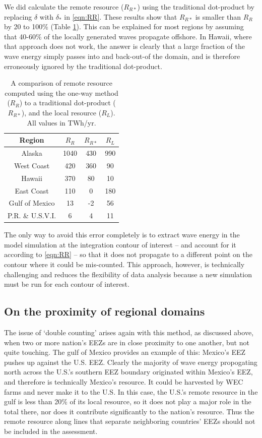 We did calculate the remote resource ($R_{R*}$) using the traditional dot-product by replacing $\delta$ with $\delta_*$ in \eqref{eqn:RR}. These results show that $R_{R*}$ is smaller than $R_R$ by 20 to 100\% (Table \ref{tab:RR*}). This can be explained for most regions by assuming that 40-60\% of the locally generated waves propagate offshore. In Hawaii, where that approach does not work, the answer is clearly that a large fraction of the wave energy simply passes into and back-out-of the domain, and is therefore erroneously ignored by the traditional dot-product.

\begin{table}[ht]
  \centering
  \begin{tabular}{cccc}
  \hline
  Region & $R_R$ & $R_{R*}$ & $R_{L}$ \\
  \hline
  Alaska & 1040 & 430 & 990 \\
  West Coast & 420 & 360 & 90 \\
  Hawaii & 370 & 80 & 10 \\
  East Coast & 110 & 0 & 180 \\
  Gulf of Mexico & 13 & -2 & 56 \\
  P.R. \& U.S.V.I. & 6 & 4 & 11 \\
  \hline
  \end{tabular}
  \label{tab:RR*}
  \caption{A comparison of remote resource computed using the one-way method ($R_R$) to a traditional dot-product ($R_{R*}$), and the local resource ($R_{L}$). All values in TWh/yr.}
\end{table}

The only way to avoid this error completely is to extract wave energy in the model simulation at the integration contour of interest -- and account for it according to \eqref{eqn:RR} -- so that it does not propagate to a different point on the contour where it could be mis-counted. This approach, however, is technically challenging and reduces the flexibility of data analysis because a new simulation must be run for each contour of interest.

\subsection{On the proximity of regional domains}

The issue of `double counting' arises again with this method, as discussed above, when two or more nation's EEZs are in close proximity to one another, but not quite touching. The gulf of Mexico provides an example of this: Mexico's EEZ pushes up against the U.S. EEZ. Clearly the majority of wave energy propogating north across the U.S.'s southern EEZ boundary originated within Mexico's EEZ, and therefore is technically Mexico's resource. It could be harvested by WEC farms and never make it to the U.S. In this case, the U.S.'s remote resource in the gulf is less than 20\% of its local resource, so it does not play a major role in the total there, nor does it contribute significantly to the nation's resource. Thus the remote resource along lines that separate neighboring countries' EEZs should not be included in the assessment. 

